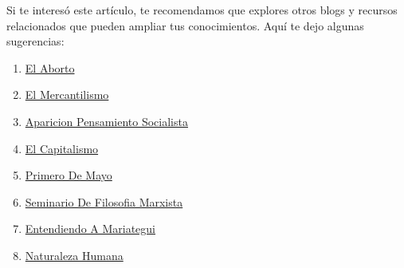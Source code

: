\documentclass[
  stu,
  floatsintext,
  longtable,
  a4paper,
  nolmodern,
  notxfonts,
  notimes,
  12pt,
  colorlinks=true,linkcolor=blue,citecolor=blue,urlcolor=blue]{apa7}
\providecommand{\tightlist}{%
  \setlength{\itemsep}{0pt}\setlength{\parskip}{0pt}}
\begin{document}
Si te interesó este artículo, te recomendamos que explores otros blogs y
recursos relacionados que pueden ampliar tus conocimientos. Aquí te dejo
algunas sugerencias:

\begin{enumerate}
\def\labelenumi{\arabic{enumi}.}
\tightlist
\item
  \href{https://dialectica-y-mercado.netlify.app/posts/2015-05-14-el-aborto/index.pdf}{}
  \href{https://dialectica-y-mercado.netlify.app/posts/2015-05-14-el-aborto}{El
  Aborto}
\item
  \href{https://dialectica-y-mercado.netlify.app/posts/2017-05-23-el-mercantilismo/index.pdf}{}
  \href{https://dialectica-y-mercado.netlify.app/posts/2017-05-23-el-mercantilismo}{El
  Mercantilismo}
\item
  \href{https://dialectica-y-mercado.netlify.app/posts/2018-04-23-aparicion-pensamiento-socialista/index.pdf}{}
  \href{https://dialectica-y-mercado.netlify.app/posts/2018-04-23-aparicion-pensamiento-socialista}{Aparicion
  Pensamiento Socialista}
\item
  \href{https://dialectica-y-mercado.netlify.app/posts/2023-03-03-el-capitalismo/index.pdf}{}
  \href{https://dialectica-y-mercado.netlify.app/posts/2023-03-03-el-capitalismo}{El
  Capitalismo}
\item
  \href{https://dialectica-y-mercado.netlify.app/posts/2023-04-29-primero-de-mayo/index.pdf}{}
  \href{https://dialectica-y-mercado.netlify.app/posts/2023-04-29-primero-de-mayo}{Primero
  De Mayo}
\item
  \href{https://dialectica-y-mercado.netlify.app/posts/2023-05-19-seminario-de-filosofia-marxista/index.pdf}{}
  \href{https://dialectica-y-mercado.netlify.app/posts/2023-05-19-seminario-de-filosofia-marxista}{Seminario
  De Filosofia Marxista}
\item
  \href{https://dialectica-y-mercado.netlify.app/posts/2023-06-09-entendiendo-a-mariategui/index.pdf}{}
  \href{https://dialectica-y-mercado.netlify.app/posts/2023-06-09-entendiendo-a-mariategui}{Entendiendo
  A Mariategui}
\item
  \href{https://dialectica-y-mercado.netlify.app/posts/2023-06-09-naturaleza-humana/index.pdf}{}
  \href{https://dialectica-y-mercado.netlify.app/posts/2023-06-09-naturaleza-humana}{Naturaleza
  Humana}
\end{enumerate}
\end{document}
